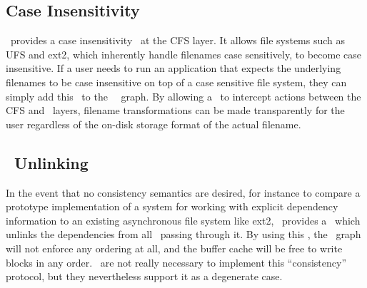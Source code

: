 


\subsection{Case Insensitivity}
\label{sec:modules:icase}

\Kudos\ provides a case insensitivity \module\ at the CFS layer. It allows file
systems such as UFS and ext2, which inherently handle filenames case
sensitively, to become case insensitive. If a user needs to run an application
that expects the underlying filenames to be case insensitive on top of a case
sensitive file system, they can simply add this \module\ to the \Kudos\
\module\ graph. By allowing a \module\ to intercept actions between the CFS and
\LFS\ layers, filename transformations can be made transparently for the user
regardless of the on-disk storage format of the actual filename.

\subsection{\ChDesc\ Unlinking}
\label{sec:modules:unlink}

In the event that no consistency semantics are desired, for instance to compare
a prototype implementation of a system for working with explicit dependency
information to an existing asynchronous file system like ext2, \Kudos\ provides
a \module\ which unlinks the dependencies from all \chdescs\ passing through it.
By using this \module, the \chdesc\ graph will not enforce any ordering at all,
and the buffer cache will be free to write blocks in any order. \Chdescs\ are
not really necessary to implement this ``consistency'' protocol, but they
nevertheless support it as a degenerate case.
